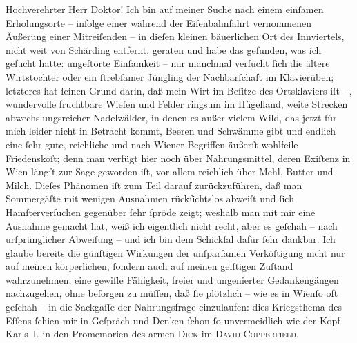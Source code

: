 \pstart{}Hochverehrter Herr Doktor!\pend\vspace{0.5em}
\pstart
           Ich bin auf meiner Suche nach einem einſamen Erholungsorte – infolge einer während
               der Eiſenbahnfahrt vernommenen Äußerung einer Mitreiſenden – in dieſen kleinen
               bäuerlichen Ort des Innviertels, nicht weit von
                  Schärding entfernt, geraten und habe das
               gefunden, was ich geſucht hatte: ungeſtörte Einſamkeit – nur manchmal verſucht ſich
               die ältere Wirtstochter oder
               ein ſtrebſamer Jüngling der Nachbarſchaft im Klavierüben; letzteres hat ſeinen Grund
               darin, daß mein Wirt im
               Beſitze des Ortsklaviers iſt –, wundervolle fruchtbare Wieſen und Felder ringsum im
               Hügelland, weite Strec{\pb}ken
               abwechslungsreicher Nadelwälder, in denen es außer vielem Wild, das jetzt für mich
               leider nicht in Betracht kommt, Beeren und Schwämme gibt und endlich eine ſehr gute,
               reichliche und nach Wiener Begriffen äußerſt
               wohlfeile Friedenskoſt; denn man verfügt hier noch über Nahrungsmittel, deren
               Exiſtenz in Wien längſt zur Sage geworden iſt, vor
               allem reichlich über Mehl, Butter und Milch. Dieſes Phänomen iſt zum Teil darauf
               zurückzuführen, daß man Sommergäſte mit wenigen Ausnahmen rückſichtslos abweiſt und
               ſich Hamſterverſuchen gegenüber ſehr ſpröde zeigt; weshalb man mit mir eine Ausnahme
               gemacht hat, weiß ich eigentlich nicht recht, aber es geſchah – nach urſprünglicher
               Abweiſung – und ich bin dem Schickſal dafür ſehr dankbar. Ich glaube bereits die
               günſtigen Wirkungen der unſparſamen {\pb}Verköſtigung nicht nur auf meinen körperlichen, ſondern auch auf meinen geiſtigen
               Zuſtand wahrzunehmen, eine gewiſſe Fähigkeit, freier und ungenierter Gedankengängen
               nachzugehen, ohne beſorgen zu müſſen, daß ſie plötzlich – wie es in Wienſo oft geſchah – in die Sackgaſſe der Nahrungsfrage
               einzulaufen: dies Kriegsthema des Eſſens ſchien mir in Geſpräch und Denken ſchon ſo
               unvermeidlich wie der Kopf Karls I. in den Promemorien des armen \textsc{Dick} im \textsc{David Copperfield}.\pend
           
